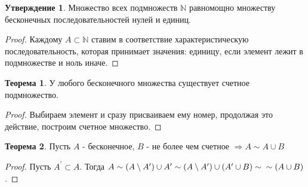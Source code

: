 \documentclass[a4paper, 12pt]{article}
\newcommand{\N}{\mathbb{N}}
\theoremstyle{definition}
\newtheorem*{theorem}{Теорема}
\newtheorem*{statement}{Утверждение}
\begin{document}
        \begin{statement}
            Множество всех подмножеств $\N$ равномощно множеству бесконечных последовательностей нулей и единиц.
        \end{statement}
        \begin{proof}
            Каждому $A\subset \N$ ставим в соответствие характеристическую последовательность, которая принимает значения: единицу, если элемент лежит в подмножестве и ноль иначе.
        \end{proof}
        \begin{theorem}
            У любого бесконечного множества существует счетное подмножество.
        \end{theorem} 
        \begin{proof}
            Выбираем элемент и сразу присваиваем ему номер, продолжая это действие, построим счетное множество.
        \end{proof}
        \begin{theorem}
            Пусть $A$ - бесконечное, $B$ - не более чем счетное $\Rightarrow A\sim A\cup B$
        \end{theorem} 
        \begin{proof}
            Пусть $A^{\prime}\subset A$. Тогда $A\sim (A\setminus A^{\prime})\cup A^{\prime}\sim (A\setminus A^{\prime})\cup(A^{\prime}\cup B)\sim\\ \sim(A\cup B)$.
        \end{proof}
\end{document}
